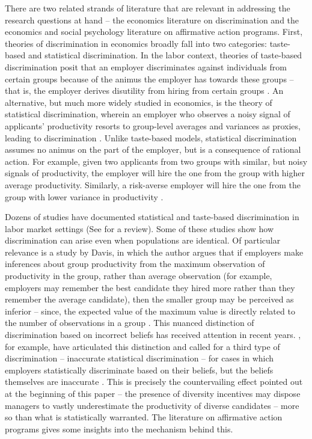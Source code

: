 \documentclass[11pt]{article}
\begin{document}
There are two related strands of literature that are relevant in addressing the research questions at hand -- the economics literature on discrimination and the economics and social psychology literature on affirmative action programs. First, theories of discrimination in economics broadly fall into two categories: taste-based and statistical discrimination. In the labor context, theories of taste-based discrimination posit that an employer discriminates against individuals from certain groups because of the animus the employer has towards these groups -- that is, the employer derives disutility from hiring from certain groups \parencite{becker_economics_1971}. An alternative, but much more widely studied in economics, is the theory of statistical discrimination, wherein an employer who observes a noisy signal of applicants' productivity resorts to group-level averages and variances as proxies, leading to discrimination \parencite{arrow_theory_1973,phelps_statistical_1972,aigner_statistical_1977}. Unlike taste-based models, statistical discrimination assumes no animus on the part of the employer, but is a consequence of rational action. For example, given two applicants from two groups with similar, but noisy signals of productivity, the employer will hire the one from the group with higher average productivity. Similarly, a risk-averse employer will hire the one from the group with lower variance in productivity \parencite{aigner_statistical_1977}.

Dozens of studies have documented statistical and taste-based discrimination in labor market settings (See \cite{bertrand_chapter_2017,anderson_discrimination_2005,guryan_tastebased_2013} for a review). Some of these studies show how discrimination can arise even when populations are identical. Of particular relevance is a study by Davis, in which the author argues that if employers make inferences about group productivity from the maximum observation of productivity in the group, rather than average observation (for example, employers may remember the best candidate they hired more rather than they remember the average candidate), then the smaller group may be perceived as inferior -- since, the expected value of the maximum value is directly related to the number of observations in a group \parencite{davis_maximal_1987}. This nuanced distinction of discrimination based on incorrect beliefs has received attention in recent years. \citeauthor{bohren_inaccurate_2019}, for example, have articulated this distinction and called for a third type of discrimination -- inaccurate statistical discrimination -- for cases in which employers statistically discriminate based on their beliefs, but the beliefs themselves are inaccurate \parencite{bohren_inaccurate_2019}. This is precisely the countervailing effect pointed out at the beginning of this paper -- the presence of diversity incentives may dispose managers to vastly underestimate the productivity of diverse candidates -- more so than what is statistically warranted. The literature on affirmative action programs gives some insights into the mechanism behind this.
\end{document}
